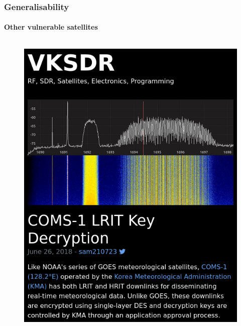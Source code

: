 \documentclass{beamer}
\begin{document}
\begin{frame}
  \frametitle{Generalisability}
  \framesubtitle{Other vulnerable satellites}
  \begin{columns}[t]
    \begin{column}{4cm}
      \begin{figure}
          \includegraphics[width=\columnwidth]{images/lrit-key-dec.png}
          \label{fig:lrit-key-dec}
      \end{figure}
    \end{column}


\end{columns}
\end{frame}
\end{document}
